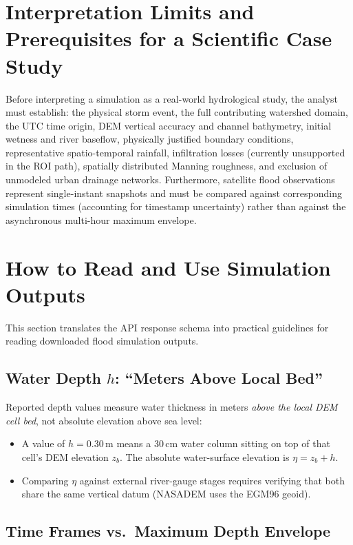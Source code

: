 \documentclass[11pt,a4paper]{article}
\begin{document}
\section{Interpretation Limits and Prerequisites for a Scientific Case Study}
\label{sec:limites}
Before interpreting a simulation as a real-world hydrological study, the analyst must establish: the physical storm event, the full contributing watershed domain, the UTC time origin, DEM vertical accuracy and channel bathymetry, initial wetness and river baseflow, physically justified boundary conditions, representative spatio-temporal rainfall, infiltration losses (currently unsupported in the ROI path), spatially distributed Manning roughness, and exclusion of unmodeled urban drainage networks. Furthermore, satellite flood observations represent single-instant snapshots and must be compared against corresponding simulation times (accounting for timestamp uncertainty) rather than against the asynchronous multi-hour maximum envelope.

\section{How to Read and Use Simulation Outputs}
\label{sec:leer-resultados}

This section translates the API response schema into practical guidelines for reading downloaded flood simulation outputs.

\subsection{Water Depth $h$: ``Meters Above Local Bed''}

Reported depth values measure water thickness in meters \emph{above the local DEM cell bed}, not absolute elevation above sea level:
\begin{itemize}
  \item A value of $h = 0.30$\,m means a 30\,cm water column sitting on top of that cell's DEM elevation $z_b$. The absolute water-surface elevation is $\eta = z_b + h$.
  \item Comparing $\eta$ against external river-gauge stages requires verifying that both share the same vertical datum (NASADEM uses the EGM96 geoid).
\end{itemize}

\subsection{Time Frames vs.\ Maximum Depth Envelope}
\end{document}
